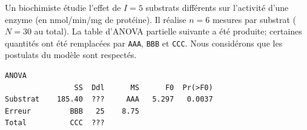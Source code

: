 \documentclass{Evaluation}
\begin{document}
\begin{questions}
\pageblanche


\question
Un biochimiste étudie l'effet de $I=5$ substrats différents sur l'activité d'une enzyme
(en nmol/min/mg de protéine). Il réalise $n=6$ mesures par substrat ($N=30$ au total).
La table d'ANOVA partielle suivante a été produite; certaines quantités ont été remplacées
par \texttt{AAA}, \texttt{BBB} et \texttt{CCC}.
Nous considérons que les postulats du modèle sont respectés.

\begin{verbatim}
ANOVA
                SS  Ddl      MS      F0  Pr(>F0)
Substrat    185.40  ???     AAA   5.297   0.0037
Erreur         BBB   25    8.75
Total          CCC  ???
\end{verbatim}

\end{questions}
\end{document}
